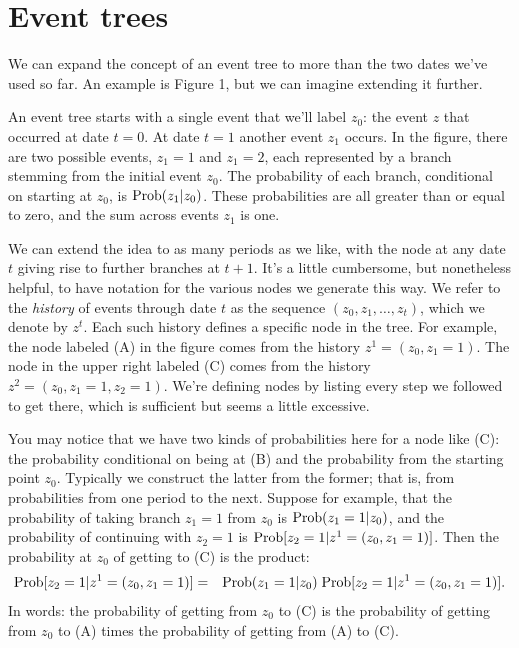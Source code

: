 \documentclass[11pt]{article}
\begin{document}
\section{Event trees}


We can expand the concept of an event tree to more than the two
dates we've used so far.
An example is Figure 1, but we can imagine extending it further.

An event tree starts with a single event that we'll label $z_0$:
the event $z$ that occurred at date $t=0$.
At date $t=1$ another event $z_1$ occurs.
In the figure, there are two possible events, $z_1 = 1$ and $z_1 = 2$,
each represented by a branch stemming from the initial event $z_0$.
The probability of each branch, conditional on starting at $z_0$,
is $\mbox{Prob}(z_1| z_0)$. These probabilities are all greater than or equal to zero,
and the sum across events $z_1$ is one.

We can extend the idea to as many periods as we like,
with the node at any date $t$ giving rise to further branches at $t+1$.
It's a little cumbersome, but nonetheless helpful,
to have notation for the various nodes we generate this way.
We refer to the {\it history\/} of events through date $t$
as the sequence $(z_0, z_1, \ldots, z_t)$, which we denote by $z^t$.
Each such history defines a specific node in the tree.
For example, the node labeled (A) in the figure comes from the history
$z^1 = (z_0, z_1 = 1)$.
The node in the upper right labeled (C)
comes from the history $z^2 = (z_0, z_1 = 1, z_2 = 1)$.
We're defining nodes by listing every step we followed to get there,
which is sufficient but seems a little excessive.

You may notice that we have two kinds of probabilities here for
a node like (C):  the probability conditional on being at (B)
and the probability from the starting point $z_0$.
Typically we construct the latter from the former; that is, from
probabilities from one period to the next.
Suppose for example, that the probability of
taking branch $z_1=1$ from $z_0$ is $\mbox{Prob}(z_1=1| z_0)$,
and the probability of continuing with $z_2 = 1$ is $\mbox{Prob}[z_2=1 | z^1 = (z_0, z_1=1) ]$.
Then the probability at $z_0$ of getting to (C) is the product:
\begin{eqnarray*}
    \mbox{Prob}[z_2=1 | z^1 = (z_0, z_1=1) ] &=& \mbox{Prob}(z_1=1| z_0) \; \mbox{Prob}[z_2=1 | z^1 = (z_0, z_1=1) ] .
\end{eqnarray*}
In words:  the probability of getting from $z_0$ to (C)
is the probability of getting from $z_0$ to (A)
times the probability of getting from (A) to (C).
\end{document}
